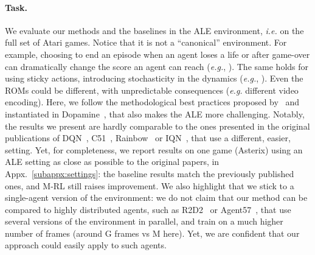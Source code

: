 \documentclass{article}
\begin{document}
\paragraph{Task.} 
We evaluate our methods and the baselines in the ALE environment, \textit{i.e.} on the full set of  Atari games.
Notice that it is not a ``canonical'' environment. For example, choosing to end an episode when an agent loses a life or after game-over can dramatically change the score an agent can reach (\textit{e.g.}, \cite[Fig.~4]{castro2018dopamine}). The same holds for using sticky actions, introducing stochasticity in the dynamics (\textit{e.g.}, \cite[Fig.~6]{castro2018dopamine}). Even the ROMs could be different, with unpredictable consequences (\textit{e.g.} different video encoding). Here, we follow the methodological best practices proposed by~\citet{machado2018revisiting} and instantiated in Dopamine~\cite{castro2018dopamine}, that also makes the ALE more challenging. Notably, the results we present are hardly comparable to the ones presented in the original publications of DQN~\cite{mnih2015human}, C51~\cite{bellemare2017distributional}, Rainbow~\cite{hessel2018rainbow} or IQN~\cite{dabney2018implicit}, that use a different, easier, setting. Yet, for completeness, we report results on one game (Asterix) using an ALE setting as close as possible to the original papers, in Appx.~\ref{subappx:settings}: the baseline results match the previously published ones, and M-RL still raises improvement. We also highlight that we stick to a single-agent version of the environment: we do not claim that our method can be compared to highly distributed agents, such as R2D2~\citep{kapturowski2018recurrent} or Agent57~\citep{badia2020agent57}, that use several versions of the environment in parallel, and train on a much higher number of frames (around G frames vs M here). Yet, we are confident that our approach could easily apply to such agents.
\end{document}
